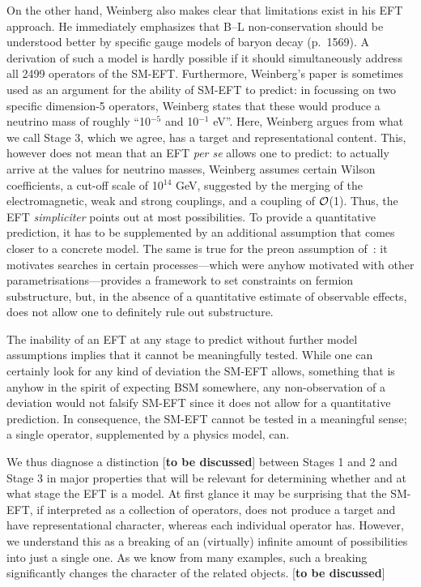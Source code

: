 On the other hand, Weinberg also makes clear that limitations exist in his EFT approach. 
He immediately emphasizes that B--L non-conservation should be understood better by specific gauge models of baryon decay (p.~1569).
A derivation of such a model is hardly possible if it should simultaneously address all 2499 operators of the SM-EFT.
Furthermore, Weinberg's paper is sometimes used as an argument for the ability of SM-EFT to predict: in focussing on two specific dimension-5 operators, Weinberg states that these would produce a neutrino mass of roughly ``10$^{-5}$ and 10$^{-1}$ eV''.
Here, Weinberg argues from what we call Stage 3, which we agree, has a target and representational content.
This, however does not mean that an EFT \textit{per se} allows one to predict: to actually arrive at the values for neutrino masses,
Weinberg assumes certain Wilson coefficients, a cut-off scale of 
10$^{14}$ GeV, suggested by the merging of the electromagnetic, weak and strong couplings, and a coupling of $\cal{O}$(1).
Thus, the EFT \textit{simpliciter} points out at most possibilities. 
To provide a quantitative prediction, it has to be supplemented by an additional assumption that comes closer to a concrete model.
The same is true for the preon assumption of~\cite{Eichten:1983hw}: it motivates searches in certain processes---which were anyhow motivated with other parametrisations---provides a framework to set constraints on fermion substructure, but, in the absence of a quantitative estimate of observable effects, does not allow one to definitely rule out substructure. 

The inability of an EFT at any stage to predict without further model assumptions implies that it cannot be meaningfully tested.
While one can certainly look for any kind of deviation the SM-EFT allows, something that is anyhow in the spirit of expecting BSM somewhere, any non-observation of a deviation would not falsify SM-EFT since it does not allow for a quantitative prediction.  
In consequence, the SM-EFT cannot be tested in a meaningful sense; 
a single operator, supplemented by a physics model, can. 

We thus diagnose a distinction [\textbf{to be discussed}] between Stages 1 and 2 and Stage 3 in major properties that will be relevant for determining whether and at what stage the EFT is a model. 
At first glance it may be surprising that the SM-EFT, if interpreted as a collection of operators, does not produce a target and have representational character, whereas each individual operator has.
However, we understand this as a breaking of an (virtually) infinite amount of possibilities into just a single one.
As we know from many examples, such a breaking significantly changes the character of the related objects. [\textbf{to be discussed}]
  
